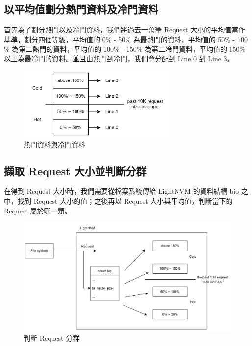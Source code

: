 \subsection{以平均值劃分熱門資料及冷門資料}\label{s3.2.1}
\indent
首先為了劃分熱門以及冷門資料，我們將過去一萬筆 Request 大小的平均值當作基準，劃分四個等級，平均值的 0\% - 50\% 為最熱門的資料，平均值的 50\% - 100 \% 為第二熱門的資料，平均值的 100\% - 150\% 為第二冷門資料，平均值的 150\% 以上為最冷門的資料。並且由熱門到冷門，我們會分配到 Line 0 到 Line 3。
\begin{figure}[H]
    \centering
    \includegraphics[width=0.7\textwidth]{picture/ch3/hot_cold.png}
    \caption{熱門資料與冷門資料}
    \label{f3.2}
\end{figure}

\subsection{擷取 Request 大小並判斷分群}\label{s3.2.2}
\indent
在得到 Request 大小時，我們需要從檔案系統傳給 LightNVM 的資料結構 bio 之中，找到 Request 大小的值；之後再以 Request 大小與平均值，判斷當下的 Request 屬於哪一類。
\begin{figure}[H]
    \centering
    \includegraphics[width=1\textwidth]{picture/ch3/get_rq_size_hot_cold.png}
    \caption{判斷 Request 分群}
    \label{f3.3}
\end{figure}


